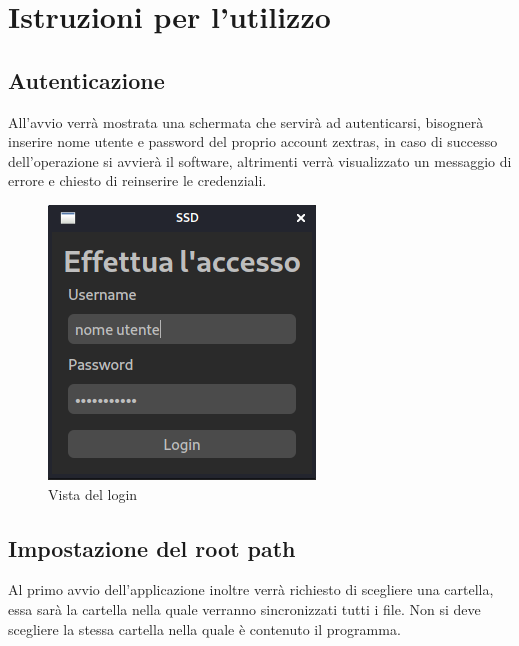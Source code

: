 \section{Istruzioni per l'utilizzo}
\subsection{Autenticazione}

All'avvio verrà mostrata una schermata che servirà ad autenticarsi, bisognerà inserire nome utente e password del proprio account zextras, in caso di successo dell'operazione si avvierà il software, altrimenti verrà visualizzato un messaggio di errore e chiesto di reinserire le credenziali.

\begin{figure}[H]
    \centering
    \includegraphics[scale = 0.50]{components/img/login.png}
    \caption{Vista del login}
    \label{fig:Vista del login}
\end{figure}

\subsection{Impostazione del root path}

Al primo avvio dell'applicazione inoltre verrà richiesto di scegliere una cartella, essa sarà la cartella nella quale verranno sincronizzati tutti i file. Non si deve scegliere la stessa cartella nella quale è contenuto il programma.

